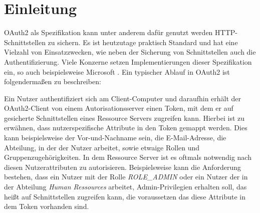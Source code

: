 \chapter{Einleitung}
\label{ch:intro}
OAuth2 als Spezifikation kann unter anderem dafür genutzt werden \linebreak \ac{HTTP}-Schnittstellen zu sichern. Es ist heutzutage praktisch Standard und hat eine Vielzahl von Einsatzzwecken, wie neben der Sicherung von Schnittstellen auch die Authentifizierung. Viele Konzerne setzen Implementierungen dieser Spezifikation ein, so auch beispielsweise Microsoft \citep{microsoftoauth2:2021:07}. Ein typischer Ablauf in OAuth2 ist folgendermaßen zu beschreiben:\smallskip

Ein Nutzer authentifiziert sich am Client-Computer und daraufhin erhält der OAuth2-Client von einem Autorisationsserver einen Token, mit dem er auf gesicherte Schnittstellen eines Ressource Servers zugreifen kann. Hierbei ist zu erwähnen, dass nutzerspezifische Attribute in den Token gemappt werden. Dies kann beispielsweise der Vor-und-Nachname sein, die E-Mail-Adresse, die Abteilung, in der der Nutzer arbeitet, sowie etwaige Rollen und Gruppenzugehörigkeiten. In dem Ressource Server ist es oftmals notwendig nach diesen Nutzerattributen zu autorisieren. Beispielsweise kann die Anforderung bestehen, dass ein Nutzer mit der Rolle \emph{ROLE\_ADMIN} oder ein Nutzer der in der Abteilung \emph{Human Ressources} arbeitet, Admin-Privilegien erhalten soll, das heißt auf Schnittstellen zugreifen kann, die voraussetzen das diese Attribute in dem Token vorhanden sind.\smallskip

